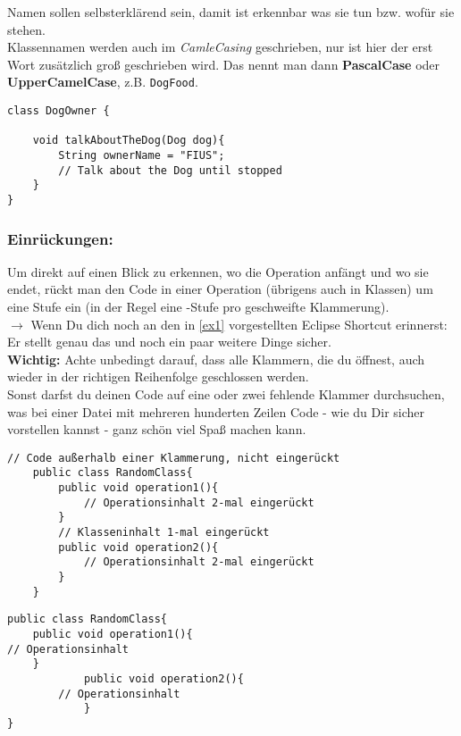 \noindent
Namen sollen selbsterklärend sein, damit ist erkennbar was sie tun bzw. wofür sie stehen.\\

\noindent
Klassennamen werden auch im \textit{CamleCasing} geschrieben, nur ist hier der erst Wort zusätzlich groß geschrieben wird.
Das nennt man dann \textbf{PascalCase} oder \textbf{UpperCamelCase}, z.B. \lstinline{DogFood}.

\vspace{5mm}

\newpage

\begin{lstlisting}[title=\textbf{Beispiel: Gute Namensgebung}]
class DogOwner {

	void talkAboutTheDog(Dog dog){
		String ownerName = "FIUS";
		// Talk about the Dog until stopped
	}
}
\end{lstlisting}

\subsubsection*{Einrückungen:}
Um direkt auf einen Blick zu erkennen, wo die Operation anfängt und wo sie endet, rückt man den Code in einer Operation (übrigens auch in Klassen) um eine Stufe ein (in der Regel eine -Stufe pro geschweifte Klammerung).\\
$\rightarrow$ Wenn Du dich noch an den in \ref{ex1} vorgestellten Eclipse Shortcut erinnerst: Er stellt genau das und noch ein paar weitere Dinge sicher.\\

\noindent
{\color{red}\bfseries Wichtig:} Achte unbedingt darauf, dass alle Klammern, die du öffnest, auch wieder in der richtigen Reihenfolge geschlossen werden.\\
Sonst darfst du deinen Code auf eine oder zwei fehlende Klammer durchsuchen, was bei einer Datei mit mehreren hunderten Zeilen Code - wie du Dir sicher vorstellen kannst - ganz schön viel Spaß machen kann.

\begin{lstlisting}[title=\textbf{Beispiel: Gute Bezeichner}]
	// Code außerhalb einer Klammerung, nicht eingerückt
	public class RandomClass{
		public void operation1(){
			// Operationsinhalt 2-mal eingerückt
		}
		// Klasseninhalt 1-mal eingerückt
		public void operation2(){
			// Operationsinhalt 2-mal eingerückt
		}
	}
\end{lstlisting}

\begin{lstlisting}[title=\textbf{Beispiel: Schlechte Einrückung}]
	public class RandomClass{
	public void operation1(){
// Operationsinhalt
	}
			public void operation2(){
		// Operationsinhalt
			}
}
\end{lstlisting}
